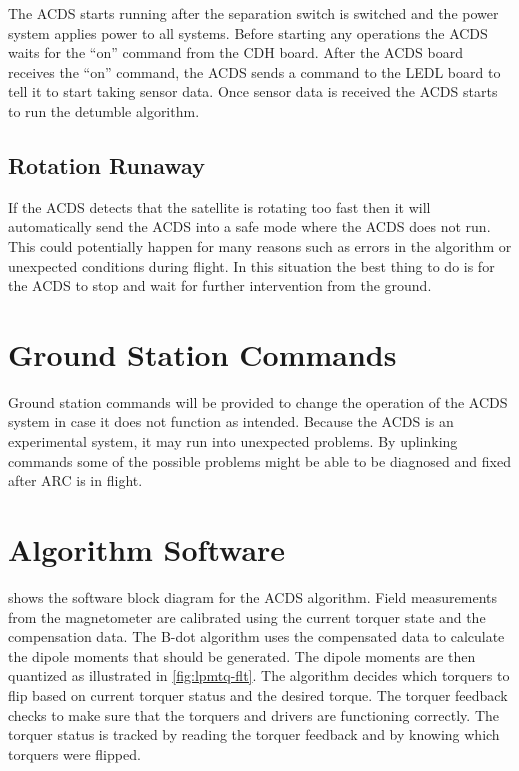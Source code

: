 The \ac{ACDS} starts running after the separation switch is switched and the power system applies power to all systems. Before starting any operations the \ac{ACDS} waits for the \enquote{on} command from the \ac{CDH} board. After the \ac{ACDS} board receives the \enquote{on} command, the \ac{ACDS} sends a command to the \ac{LEDL} board to tell it to start taking sensor data. Once sensor data is received the \ac{ACDS} starts to run the detumble algorithm.

\subsection{Rotation Runaway}

If the \ac{ACDS} detects that the satellite is rotating too fast then it will automatically send the \ac{ACDS} into a safe mode where the \ac{ACDS} does not run. This could potentially happen for many reasons such as errors in the algorithm or unexpected conditions during flight. In this situation the best thing to do is for the \ac{ACDS} to stop and wait for further intervention from the ground.

\section{Ground Station Commands}

Ground station commands will be provided to change the operation of the \ac{ACDS} system in case it does not function as intended. Because the \ac{ACDS} is an experimental system, it may run into unexpected problems. By uplinking commands some of the possible problems might be able to be diagnosed and fixed after \ac{ARC} is in flight. 

\section{Algorithm Software}

 shows the software block diagram for the \ac{ACDS} algorithm. Field measurements from the magnetometer are calibrated using the current torquer state and the compensation data. The B-dot algorithm uses the compensated data to calculate the dipole moments that should be generated. The dipole moments are then quantized as illustrated in \cref{fig:lpmtq-flt}. The algorithm decides which torquers to flip based on current torquer status and the desired torque. The torquer feedback checks to make sure that the torquers and drivers are functioning correctly. The torquer status is tracked by reading the torquer feedback and by knowing which torquers were flipped.

